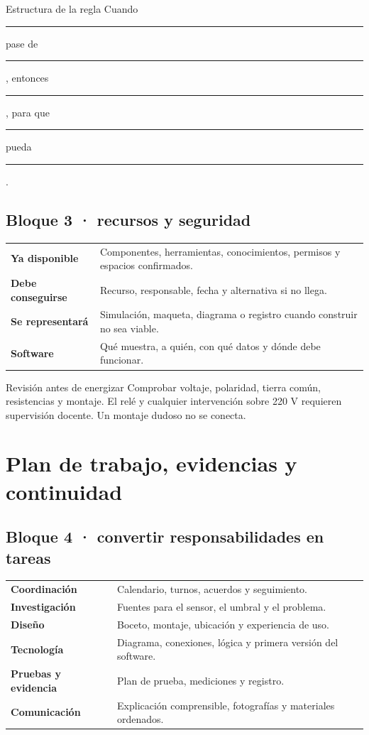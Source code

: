 \documentclass[10pt,a4paper]{article}
\begin{document}
\begin{navybox}{Estructura de la regla}
Cuando \rule{27mm}{0.35pt} pase de \rule{21mm}{0.35pt}, entonces \rule{28mm}{0.35pt}, para que \rule{24mm}{0.35pt} pueda \rule{25mm}{0.35pt}.
\end{navybox}

\subsection{Bloque 3 · recursos y seguridad}
\begin{tabularx}{\textwidth}{@{}p{39mm}Y@{}}
\textbf{Ya disponible} & Componentes, herramientas, conocimientos, permisos y espacios confirmados. \\
\textbf{Debe conseguirse} & Recurso, responsable, fecha y alternativa si no llega. \\
\textbf{Se representará} & Simulación, maqueta, diagrama o registro cuando construir no sea viable. \\
\textbf{Software} & Qué muestra, a quién, con qué datos y dónde debe funcionar. \\
\end{tabularx}

\begin{accentbox}{Revisión antes de energizar}
Comprobar voltaje, polaridad, tierra común, resistencias y montaje. El relé y cualquier intervención sobre 220 V requieren supervisión docente. Un montaje dudoso no se conecta.
\end{accentbox}

\newpage
\section{Plan de trabajo, evidencias y continuidad}

\subsection{Bloque 4 · convertir responsabilidades en tareas}
\begin{tabularx}{\textwidth}{@{}p{36mm}Y@{}}
\textbf{Coordinación} & Calendario, turnos, acuerdos y seguimiento. \\
\textbf{Investigación} & Fuentes para el sensor, el umbral y el problema. \\
\textbf{Diseño} & Boceto, montaje, ubicación y experiencia de uso. \\
\textbf{Tecnología} & Diagrama, conexiones, lógica y primera versión del software. \\
\textbf{Pruebas y evidencia} & Plan de prueba, mediciones y registro. \\
\textbf{Comunicación} & Explicación comprensible, fotografías y materiales ordenados. \\
\end{tabularx}
\end{document}
